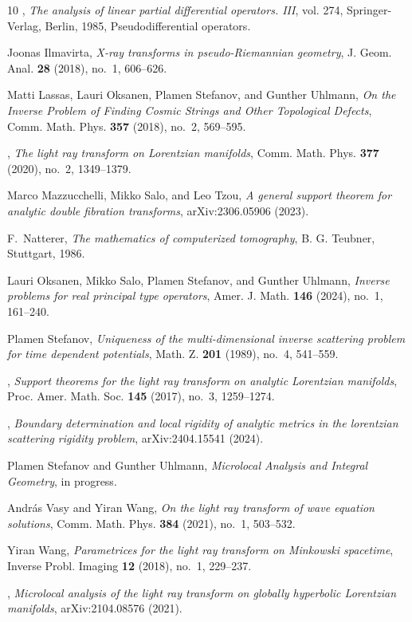 \documentclass[11pt]{amsart}
\theoremstyle{definition}
\theoremstyle{remark}
\numberwithin{equation}{section}
\begin{document}
\begin{thebibliography}{10}
\bysame, \emph{The analysis of linear partial differential operators. {III}},
  vol. 274, Springer-Verlag, Berlin, 1985, Pseudodifferential operators.

Joonas Ilmavirta, \emph{X-ray transforms in pseudo-{R}iemannian geometry}, J.
  Geom. Anal. \textbf{28} (2018), no.~1, 606--626. 

Matti Lassas, Lauri Oksanen, Plamen Stefanov, and Gunther Uhlmann, \emph{On the
  {I}nverse {P}roblem of {F}inding {C}osmic {S}trings and {O}ther {T}opological
  {D}efects}, Comm. Math. Phys. \textbf{357} (2018), no.~2, 569--595.

\bysame, \emph{The light ray transform on {L}orentzian manifolds}, Comm. Math.
  Phys. \textbf{377} (2020), no.~2, 1349--1379. 

Marco Mazzucchelli, Mikko Salo, and Leo Tzou, \emph{A general support theorem
  for analytic double fibration transforms}, arXiv:2306.05906 (2023).

F.~Natterer, \emph{The mathematics of computerized tomography}, B. G. Teubner,
  Stuttgart, 1986. 

Lauri Oksanen, Mikko Salo, Plamen Stefanov, and Gunther Uhlmann, \emph{Inverse
  problems for real principal type operators}, Amer. J. Math. \textbf{146}
  (2024), no.~1, 161--240. 

Plamen Stefanov, \emph{Uniqueness of the multi-dimensional inverse scattering
  problem for time dependent potentials}, Math. Z. \textbf{201} (1989), no.~4,
  541--559. 

\bysame, \emph{Support theorems for the light ray transform on analytic
  {L}orentzian manifolds}, Proc. Amer. Math. Soc. \textbf{145} (2017), no.~3,
  1259--1274. 

\bysame, \emph{Boundary determination and local rigidity of analytic metrics in
  the lorentzian scattering rigidity problem}, arXiv:2404.15541 (2024).

Plamen Stefanov and Gunther Uhlmann, \emph{Microlocal {A}nalysis and {I}ntegral
  {G}eometry}, in progress.

Andr\'{a}s Vasy and Yiran Wang, \emph{On the light ray transform of wave
  equation solutions}, Comm. Math. Phys. \textbf{384} (2021), no.~1, 503--532.

Yiran Wang, \emph{Parametrices for the light ray transform on {M}inkowski
  spacetime}, Inverse Probl. Imaging \textbf{12} (2018), no.~1, 229--237.

\bysame, \emph{Microlocal analysis of the light ray transform on globally
  hyperbolic {L}orentzian manifolds}, arXiv:2104.08576 (2021).

\end{thebibliography}
\end{document}
